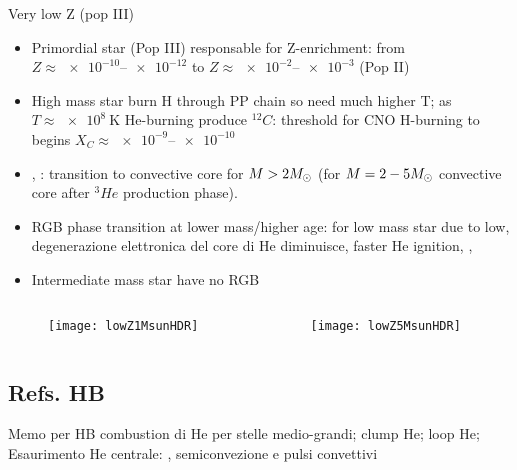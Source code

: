 \begin{frame}{Very low Z (pop III)}
\begin{itemize}
    \item Primordial star (Pop III) responsable for Z-enrichment: from $Z\approx\numrange{e-10}{e-12}$ to $Z\approx\numrange{e-2}{e-3}$ (Pop II)
    \item High mass star burn H through PP chain so need much higher T; as $T\approx\SI{e8}{\kelvin}$ He-burning produce $^{12}C$: threshold for CNO H-burning to begins $X_C\approx\numrange{e-9}{e-10}$
    \item {}, : transition to convective core for $M>2M_{\odot}{}$ (for $M=2-5M_{\odot}{}$ convective core after $^3He$ production phase).
    \item RGB phase transition at lower mass/higher age: for low mass star  due to low, degenerazione elettronica del core di He diminuisce, faster He ignition, , 
    \item Intermediate mass star have no RGB
\end{itemize}
\begin{columns}[T]
    \begin{column}{0.5\textwidth}
        \begin{figure}[!ht] 
\texttt{[image: lowZ1MsunHDR]}\label{fig:lowZ1MsunHDR}
\end{figure}
    \end{column}
    \begin{column}{0.5\textwidth}
        \begin{figure}[!ht] 
\texttt{[image: lowZ5MsunHDR]}\label{fig:lowZ5MsunHDR}
\end{figure}
    \end{column}
\end{columns}

\end{frame}

\subsection{Refs. HB}

\begin{frame}{Memo per HB}
combustion di He per stelle medio-grandi; clump He; loop He; Esaurimento He centrale: , semiconvezione e pulsi convettivi
\end{frame}

